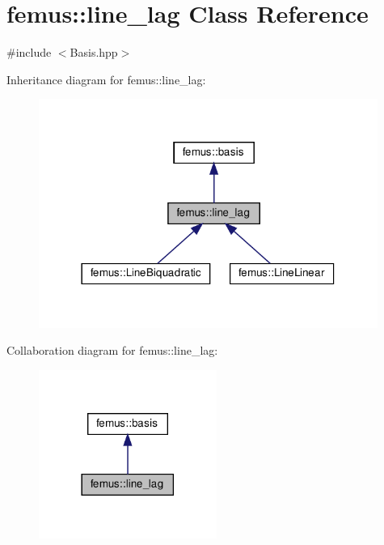 \hypertarget{classfemus_1_1line__lag}{}\section{femus\+:\+:line\+\_\+lag Class Reference}
\label{classfemus_1_1line__lag}


{\ttfamily \#include $<$Basis.\+hpp$>$}



Inheritance diagram for femus\+:\+:line\+\_\+lag\+:
\nopagebreak
\begin{figure}[H]
\begin{center}
\leavevmode
\includegraphics[width=314pt]{classfemus_1_1line__lag__inherit__graph}
\end{center}
\end{figure}


Collaboration diagram for femus\+:\+:line\+\_\+lag\+:
\nopagebreak
\begin{figure}[H]
\begin{center}
\leavevmode
\includegraphics[width=165pt]{classfemus_1_1line__lag__coll__graph}
\end{center}
\end{figure}
